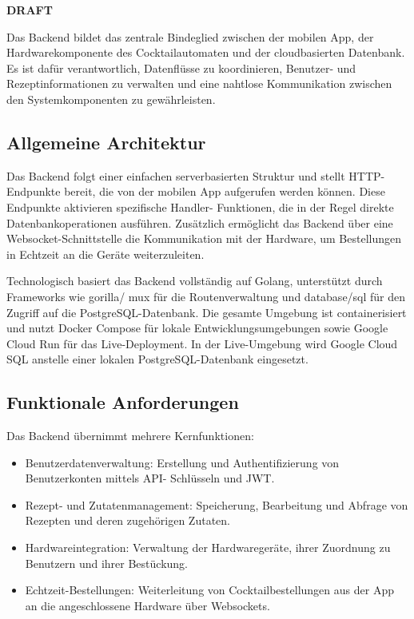 
\textbf{DRAFT}

Das Backend bildet das zentrale Bindeglied zwischen der mobilen App, der Hardwarekomponente des 
Cocktailautomaten und der cloudbasierten Datenbank. Es ist dafür verantwortlich, Datenflüsse zu 
koordinieren, Benutzer- und Rezeptinformationen zu verwalten und eine nahtlose Kommunikation 
zwischen den Systemkomponenten zu gewährleisten.

\subsection{Allgemeine Architektur}

Das Backend folgt einer einfachen serverbasierten Struktur und stellt HTTP-Endpunkte bereit, die 
von der mobilen App aufgerufen werden können. Diese Endpunkte aktivieren spezifische Handler-
Funktionen, die in der Regel direkte Datenbankoperationen ausführen. Zusätzlich ermöglicht das 
Backend über eine Websocket-Schnittstelle die Kommunikation mit der Hardware, um Bestellungen in 
Echtzeit an die Geräte weiterzuleiten.

Technologisch basiert das Backend vollständig auf Golang, unterstützt durch Frameworks wie gorilla/
mux für die Routenverwaltung und database/sql für den Zugriff auf die PostgreSQL-Datenbank. Die 
gesamte Umgebung ist containerisiert und nutzt Docker Compose für lokale Entwicklungsumgebungen 
sowie Google Cloud Run für das Live-Deployment. In der Live-Umgebung wird Google Cloud SQL 
anstelle einer lokalen PostgreSQL-Datenbank eingesetzt.

\subsection{Funktionale 
Anforderungen}

Das Backend übernimmt mehrere Kernfunktionen:
\begin{itemize}
	\item Benutzerdatenverwaltung: Erstellung und Authentifizierung von Benutzerkonten mittels API-
	Schlüsseln und JWT.
	\item Rezept- und Zutatenmanagement: Speicherung, Bearbeitung und Abfrage von Rezepten und deren 
	zugehörigen Zutaten.
	\item Hardwareintegration: Verwaltung der Hardwaregeräte, ihrer Zuordnung zu Benutzern und ihrer 
	Bestückung.
	\item Echtzeit-Bestellungen: Weiterleitung von Cocktailbestellungen aus der App an die 
	angeschlossene Hardware über Websockets.
\end{itemize}

